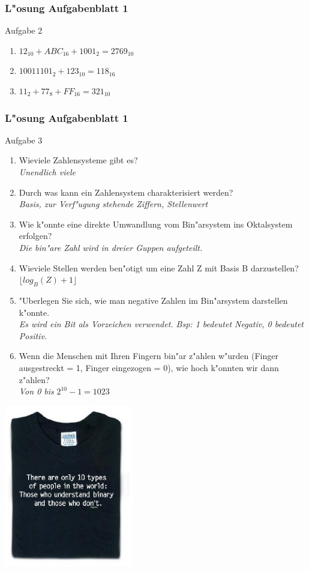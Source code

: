 \documentclass{beamer}
\begin{document}
\frame
{
	\frametitle{L"osung Aufgabenblatt 1}
	Aufgabe 2
	\begin{enumerate}
	\item $12_{10} + ABC_{16} + 1001_{2} = 2769_{10}$
	\item $10011101_{2} + 123_{10} = 118_{16}$
	\item $11_{2} + 77_{8} + FF_{16} = 321_{10}$
	\end{enumerate}
}
\frame
{
	\frametitle{L"osung Aufgabenblatt 1}
	{\tiny
	Aufgabe 3
	\begin{enumerate}
	\item Wieviele Zahlensysteme gibt es?\\
	\emph{Unendlich viele}
	\item Durch was kann ein Zahlensystem charakterisiert werden?\\
	\emph{Basis, zur Verf"ugung stehende Ziffern, Stellenwert}
	\item Wie k"onnte eine direkte Umwandlung vom Bin"arsystem ins Oktalsystem erfolgen?\\
	\emph{Die bin"are Zahl wird in dreier Guppen aufgeteilt.}
	\item Wieviele Stellen werden ben"otigt um eine Zahl Z mit Basis B darzustellen?\\
	$\lfloor log_B(Z) + 1 \rfloor$
	\item "Uberlegen Sie sich, wie man negative Zahlen im Bin"arsystem darstellen k"onnte.\\
	\emph{Es wird ein Bit als Vorzeichen verwendet. Bsp: 1 bedeutet Negativ, 0 bedeutet Positiv.}
	\item Wenn die Menschen mit Ihren Fingern bin"ar z"ahlen w"urden (Finger ausgestreckt = 1, Finger eingezogen = 0), wie hoch k"onnten wir dann z"ahlen?\\
	\emph{Von 0 bis} $2^{10}-1 = 1023$
	\end{enumerate}
	}
}

\frame
{
	\begin{center}
	\includegraphics[width=160pt]{binary-people.eps}
	\end{center}
}
\end{document}

